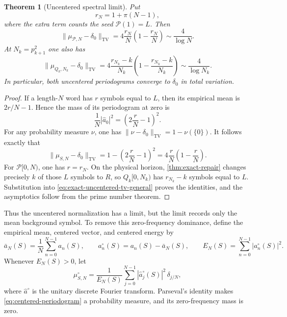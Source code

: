 \documentclass[11pt]{article}
\newtheorem{theorem}{Theorem}[section]
\theoremstyle{definition}
\theoremstyle{remark}
\newcommand{\cP}{\mathcal{P}}
\newcommand{\TV}{\mathrm{TV}}
\begin{document}
\begin{theorem}[Uncentered spectral limit]\label{thm:uncentered-limit}
Put
\begin{equation}\label{eq:prime-count-rN}
    r_N=1+\pi(N-1),
\end{equation}
where the extra term counts the seed $\cP(1)=L$.  Then
\begin{equation}\label{eq:prime-delta0-tv}
    \|\mu_{\cP,N}-\delta_0\|_{\TV}
    =4\frac{r_N}{N}\left(1-\frac{r_N}{N}\right)
    \sim\frac4{\log N}.
\end{equation}
At $N_k=p_{k+1}^2$ one also has
\begin{equation}\label{eq:sieve-delta0-tv}
    \|\mu_{Q_k,N_k}-\delta_0\|_{\TV}
    =4\frac{r_{N_k}-k}{N_k}
      \left(1-\frac{r_{N_k}-k}{N_k}\right)
    \sim\frac4{\log N_k}.
\end{equation}
In particular, both uncentered periodograms converge to $\delta_0$ in total variation.
\end{theorem}

\begin{proof}
If a length-$N$ word has $r$ symbols equal to $L$, then its empirical mean is $2r/N-1$.  Hence the mass of its periodogram at zero is
\[
    \frac1N|\widehat a_0|^2
    =\left(2\frac rN-1\right)^2.
\]
For any probability measure $\nu$, one has
$\|\nu-\delta_0\|_{\TV}=1-\nu(\{0\})$.  It follows exactly that
\begin{equation}\label{eq:exact-uncentered-tv-general}
    \|\mu_{S,N}-\delta_0\|_{\TV}
    =1-\left(2\frac rN-1\right)^2
    =4\frac rN\left(1-\frac rN\right).
\end{equation}
For $\cP[0,N)$, one has $r=r_N$.  On the physical horizon, \cref{thm:exact-repair} changes precisely $k$ of those $L$ symbols to $R$, so $Q_k[0,N_k)$ has $r_{N_k}-k$ symbols equal to $L$.  Substitution into \eqref{eq:exact-uncentered-tv-general} proves the identities, and the asymptotics follow from the prime number theorem.
\end{proof}

Thus the uncentered normalization has a limit, but the limit records only the mean background symbol.  To remove this zero-frequency dominance, define the empirical mean, centered vector, and centered energy by
\begin{equation}\label{eq:centered-vector}
    \bar a_N(S)=\frac1N\sum_{n=0}^{N-1}a_n(S),
    \qquad
    a_n^{\circ}(S)=a_n(S)-\bar a_N(S),
    \qquad
    E_N(S)=\sum_{n=0}^{N-1}|a_n^{\circ}(S)|^2.
\end{equation}
Whenever $E_N(S)>0$, let
\begin{equation}\label{eq:centered-periodogram}
    \mu^{\circ}_{S,N}
    =\frac1{E_N(S)}\sum_{j=0}^{N-1}
      |\widehat a_j^{\circ}(S)|^2\,\delta_{j/N},
\end{equation}
where $\widehat a^{\circ}$ is the unitary discrete Fourier transform.  Parseval's identity makes \eqref{eq:centered-periodogram} a probability measure, and its zero-frequency mass is zero.
\end{document}
